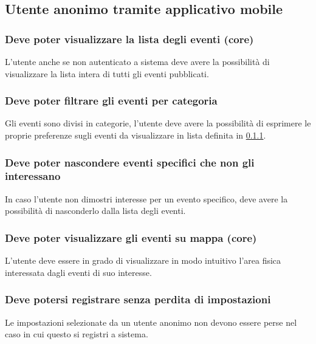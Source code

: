 \documentclass{article}
\begin{document}
\subsection{Utente anonimo tramite applicativo mobile}

\subsubsection{Deve poter visualizzare la lista degli eventi (core)}\label{Requirements:Lista}
\label{5.1.1}
L'utente anche se non autenticato a sistema deve avere la possibilità di visualizzare la lista intera di tutti gli eventi pubblicati.

\subsubsection{Deve poter filtrare gli eventi per categoria}
\label{5.1.2}
Gli eventi sono divisi in categorie, l'utente deve avere la possibilità di esprimere le proprie preferenze sugli eventi da visualizzare in lista definita in \ref{Requirements:Lista}.

\subsubsection{Deve poter nascondere eventi specifici che non gli interessano}
\label{5.1.3}
In caso l'utente non dimostri interesse per un evento specifico, deve avere la possibilità di nasconderlo dalla lista degli eventi.

\subsubsection{Deve poter visualizzare gli eventi su mappa (core)}
\label{5.1.4}
L'utente deve essere in grado di visualizzare in modo intuitivo l'area fisica interessata dagli eventi di suo interesse. 

\subsubsection{Deve potersi registrare senza perdita di impostazioni}
\label{5.1.5}
Le impostazioni selezionate da un utente anonimo non devono essere perse nel caso in cui questo si registri a sistema.
\end{document}
